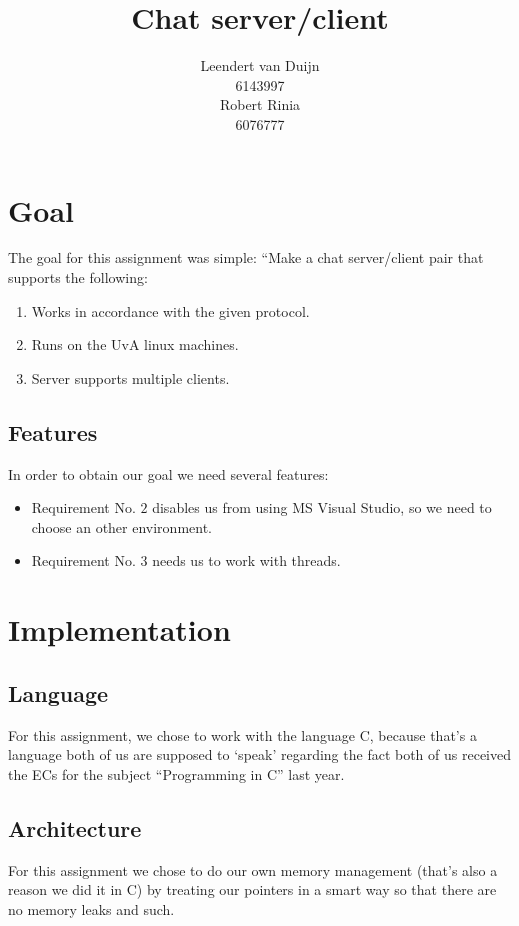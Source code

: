 \documentclass[a4paper]{article}
\author{Leendert van Duijn\\6143997\\Robert Rinia\\6076777}
\title{Chat server/client}
\begin{document}
\maketitle
\tableofcontents
\newpage
\section{Goal}
The goal for this assignment was simple: ``Make a chat server/client pair that
supports the following:\\

\begin{enumerate}
\item \label{1}Works in accordance with the given protocol.
\item \label{2}Runs on the UvA linux machines.
\item \label{3}Server supports multiple clients.
\end{enumerate}

\subsection{Features}
In order to obtain our goal we need several features:\\
\begin{itemize}
\item Requirement No. $2$ disables us from using MS Visual Studio, so we need
to choose an other environment.
\item Requirement No. $3$ needs us to work with threads.
\end{itemize}

\section{Implementation}
\subsection{Language}
For this assignment, we chose to work with the language C, because that's a
language both of us are supposed to `speak' regarding the fact both of us
received the ECs for the subject ``Programming in C'' last year.

\subsection{Architecture}
For this assignment we chose to do our own memory management (that's also a
reason we did it in C) by treating our pointers in a smart way so that there
are no memory leaks and such.
\end{document}

